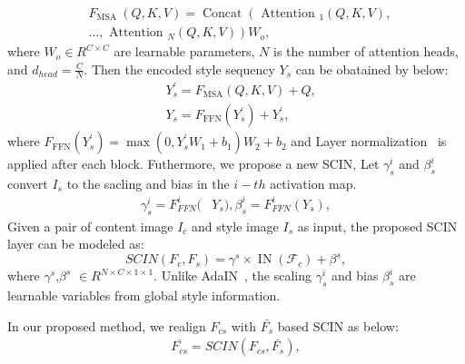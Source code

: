 \documentclass[times,twocolumn,final,authoryear]{elsarticle}
\begin{document}
\begin{equation}
\begin{aligned}
&{F}_{\text {MSA }}(Q, K, V)=\operatorname{Concat}\left(\text { Attention }_1(Q, K, V)\right. \text {, }\\
&\left.\ldots, \text { Attention }_N(Q, K, V)\right) W_o,
\end{aligned}
\end{equation}
where $W_o \in R^{C\times C}$ are learnable parameters, $N$ is the number of attention heads, and $d_{head}=\frac{C}{N}$. Then the encoded style sequency  $Y_{s}$ can be obatained by below:
\begin{equation}
\begin{aligned}
&Y_s^{\prime}={F}_{\mathrm{MSA}}(Q, K, V)+Q, \\
&Y_s={F}_{\mathrm{FFN}}\left(Y_s^{\prime}\right)+Y_s^{\prime},
\end{aligned}
\end{equation}
where ${F}_{\mathrm{FFN}}\left(Y_s^{\prime}\right)=\max \left(0, Y_s^{\prime} W_1+b_1\right) W_2+b_2$ and Layer normalization~\citep{ba2016layer} is applied after each block.
Futhermore, we propose a new SCIN, Let $\gamma^{i}_{s}$ and $\beta^{i}_{s}$ convert $I_{s}$ to the sacling and bias in the $i-th$ activation map.
\begin{equation}
\begin{aligned}
\gamma^{i}_{s}=F^{i}_{FFN}(&Y_s),\beta^{i}_{s}=F^{i}_{FFN}(Y_s),
\end{aligned}
\end{equation}
Given a pair of content image $I_{c}$ and style image $I_{s}$ as input, the proposed SCIN layer can be modeled as:
\begin{equation}
SCIN(F_{c},F_{s}) = \gamma^{s} \times \operatorname{IN}\left(\mathcal{F}_c\right) + \beta^{s},
\end{equation}
where $\gamma^{s}$,$\beta^{s}$ $\in{R}^{N \times C \times 1 \times 1}$. Unlike AdaIN~\citep{huang2017arbitrary}, the scaling $\gamma^{i}_{s}$ and bias $\beta^{i}_{s}$ are learnable variables from global style information. 

In our proposed method, we realign $F_{cs}$ with $\bar{F_{s}}$ based SCIN as below:
\begin{equation}
\begin{aligned}
\bar{F_{cs}} = SCIN(F_{cs},\bar{F_{s}}),\\
\end{aligned}
\end{equation}
\end{document}
